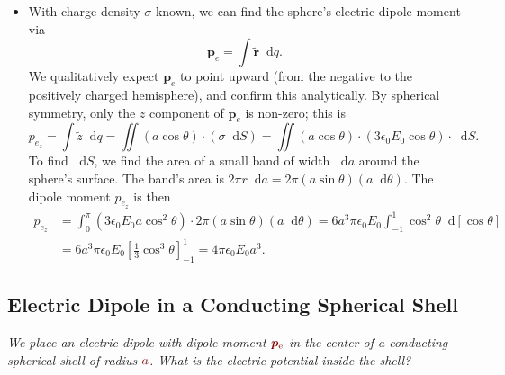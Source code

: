 \documentclass[11pt, a4paper]{article}
\newcommand{\diff}{\mathop{}\!\mathrm{d}} %
\newcommand{\dmath}[1]{\textcolor{Maroon}{#1}}  %
\renewcommand{\vec}[1]{\bm{#1}} %
\newcommand{\tvec}[1]{\tilde{\vec{#1}}} %
\newcommand{\ee}{\epsilon_{0}}  %
\newcommand{\pe}{\vec{p}_{\text{e}}}  %
\begin{document}
\begin{itemize}
	\item With charge density $ \sigma $ known, we can find the sphere's electric dipole moment via
	\begin{equation*}
		\vec{p}_{e} = \int \tvec{r} \diff q.
	\end{equation*}
	We qualitatively expect $ \vec{p}_{e} $ to point upward (from the negative to the positively charged hemisphere), and confirm this analytically. By spherical symmetry, only the $ z $ component of $ \vec{p}_{e} $ is non-zero; this is
	\begin{equation*}
		p_{e_{z}} = \int \tilde{z} \diff q = \iint (a \cos \theta) \cdot (\sigma \diff S) = \iint( a \cos \theta) \cdot (3 \ee E_{0} \cos \theta) \cdot \diff S.
	\end{equation*}
	To find $ \diff S $, we find the area of a small band of width $ \diff a $ around the sphere's surface. The band's area is $ 2\pi r \diff a = 2\pi (a \sin \theta ) (a \diff \theta) $. The dipole moment $ p_{e_{z}} $ is then
	\begin{align*}
		p_{e_{z}} &= \int_{0}^{\pi}(3\ee E_{0}a\cos^{2}\theta) \cdot 2\pi (a \sin \theta ) (a \diff \theta) = 6a^{3}\pi \ee E_{0} \int_{-1}^{1}\cos^{2}\theta \diff [\cos \theta]\\
		& = 6a^{3}\pi \ee E_{0} \left[\frac{1}{3}\cos^{3}\theta \right]_{-1}^{1} = 4\pi \ee E_{0} a^{3}.
	\end{align*}
\end{itemize}

\subsection{Electric Dipole in a Conducting Spherical Shell}
\textit{We place an electric dipole with dipole moment $ \dmath{\pe} $ in the center of a conducting spherical shell of radius $ \dmath{a} $. What is the electric potential inside the shell?}
\end{document}

